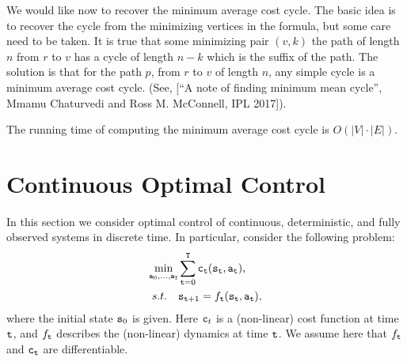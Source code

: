 We would like now to recover the minimum average cost cycle. The
basic idea is to recover the cycle from the minimizing vertices in
the formula, but some care need to be taken. It is true that some
minimizing pair $(v,k)$ the path of length $n$ from $r$ to $v$ has a
cycle of length $n-k$ which is the suffix of the path. The solution
is that for the path $p$, from $r$ to $v$ of length $n$, any simple
cycle is a minimum average cost cycle. (See, [``A note of finding
minimum mean cycle'', Mmamu Chaturvedi and Ross M. McConnell, IPL
2017]).

The running time of computing the minimum average cost cycle is
$O(|V|\cdot |E|)$.



\section{Continuous Optimal Control}
In this section we consider optimal control of continuous, deterministic, and fully observed systems in discrete time. 
In particular, consider the following problem:
\begin{equation}\label{eq:opt_control}
    \begin{split}
        \min_{{\tt a}_0,\dots,{\tt a}_{{\tt T}}} & \sum_{{\tt t}=0}^{\tt T} {\tt c}_{\tt t}({\tt s}_{\tt t}, {\tt a}_{\tt t}), \\
        s.t. \quad & {{\tt s}_{{\tt t} + 1}} = {f_{\tt t}}({{\tt s}_{\tt t}},{{\tt a}_{\tt t}}), 
    \end{split}
\end{equation}
where the initial state ${\tt s}_0$ is given. Here ${\tt c}_t$ is a (non-linear) cost function at time ${\tt t}$, and $f_{\tt t}$ describes the (non-linear) dynamics  at time ${\tt t}$. We assume here that $f_{\tt t}$ and ${\tt c}_{\tt t}$ are differentiable.

